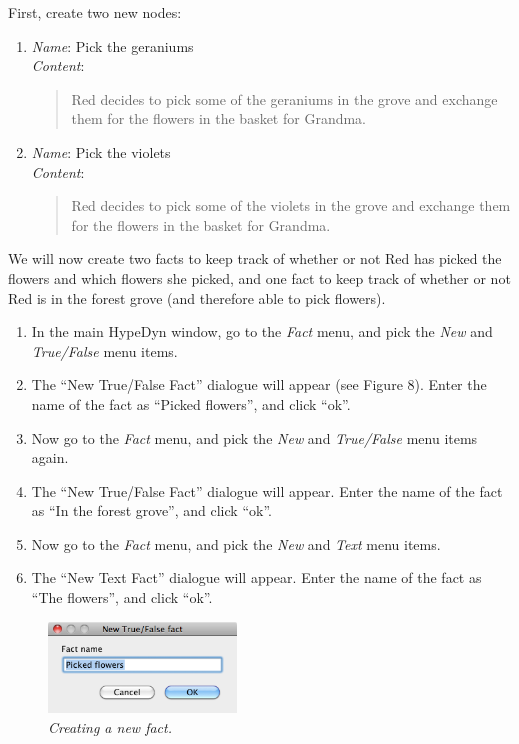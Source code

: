 \documentclass{article}
\begin{document}
First, create two new nodes:

\begin{enumerate}
  \item \textit{Name}: Pick the geraniums\\
  \textit{Content}: 
  \begin{quotation}
  Red decides to pick some of the geraniums in the grove and exchange them for
  the flowers in the basket for Grandma.
  \end{quotation}
  \item \textit{Name}: Pick the violets\\
  \textit{Content}: 
  \begin{quotation}
  Red decides to pick some of the violets in the grove and exchange them for
  the flowers in the basket for Grandma.
  \end{quotation}
\end{enumerate}

We will now create two facts to keep track of whether or not Red has picked the
flowers and which flowers she picked, and one fact to keep track of whether or
not Red is in the forest grove (and therefore able to pick flowers).

\begin{enumerate}
  \item In the main HypeDyn window, go to the \textit{Fact} menu, and pick the
  \textit{New} and \textit{True/False} menu items. 
  \item The ``New True/False Fact'' dialogue will appear (see Figure 8). Enter
  the name of the fact as ``Picked flowers'', and click ``ok''.
  \item Now go to the \textit{Fact} menu, and pick the
  \textit{New} and \textit{True/False} menu items again. 
  \item The ``New True/False Fact'' dialogue will appear. Enter
  the name of the fact as ``In the forest grove'', and click ``ok''.
  \item Now go to the \textit{Fact} menu, and pick the
  \textit{New} and \textit{Text} menu items. 
  \item The ``New Text Fact'' dialogue will appear. Enter
  the name of the fact as ``The flowers'', and click ``ok''.
\end{enumerate}

\begin{figure}[h]
  \centering
  \includegraphics[width=5cm]{images/hypedyn-tutorial-3-figure-8}
  \caption{\textit{Creating a new fact.}}
\end{figure}
\end{document}

